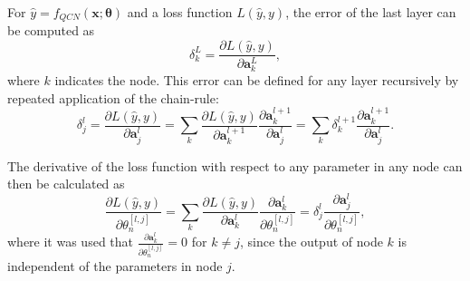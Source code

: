 For $\hat{y} = f_{QCN}(\boldsymbol{x}; \boldsymbol{\theta})$ and a loss function $L(\hat{y}, y)$, the error of the last layer can be computed as 
\begin{equation}\label{eq:lastLayerErrorQCN}
    \delta^L_k = \frac{\partial L(\hat{y}, y)}{\partial \boldsymbol{a}^L_k},
\end{equation}
where $k$ indicates the node. This error can be defined for any layer recursively by repeated application of the chain-rule:
\begin{equation}\label{eq:errorQCN}
    \delta^l_j = \frac{\partial L(\hat{y}, y)}{\partial \boldsymbol{a}^l_j} 
    = \sum_k \frac{\partial L(\hat{y}, y)}{\partial \boldsymbol{a}^{l+1}_k} \frac{\partial \boldsymbol{a}^{l+1}_k}{\partial \boldsymbol{a}^{l}_j}
    = \sum_k \delta^{l+1}_k \frac{\partial \boldsymbol{a}^{l+1}_k}{\partial \boldsymbol{a}^{l}_j}.
\end{equation}

The derivative of the loss function with respect to any parameter in any node can then be calculated as 
\begin{equation}\label{eq:derivweightsQCN}
    \frac{\partial L(\hat{y}, y)}{\partial \theta^{[l,j]}_n} = 
    \sum_k \frac{\partial L(\hat{y}, y)}{\partial \boldsymbol{a}^{l}_k} \frac{\partial \boldsymbol{a}^{l}_k}{\partial \theta^{[l,j]}_n} 
    = \delta^l_j \frac{\partial \boldsymbol{a}^{l}_j}{\partial \theta^{[l,j]}_n},
\end{equation}
where it was used that $\frac{\partial \boldsymbol{a}^{l}_k}{\partial \theta^{[l,j]}_n} = 0$ for $k \neq j$, since the output of node $k$ is independent of the parameters in node $j$. 


